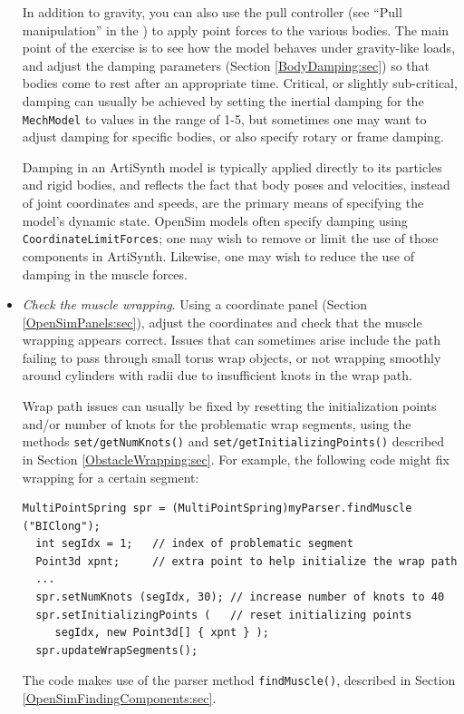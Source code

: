 \begin{itemize}
In addition to gravity, you can also use the pull controller (see ``Pull
manipulation'' in the ) to apply point forces to the various bodies. The main point of the
exercise is to see how the model behaves under gravity-like loads, and adjust
the damping parameters (Section \ref{BodyDamping:sec}) so that bodies come to
rest after an appropriate time. Critical, or slightly sub-critical, damping can
usually be achieved by setting the inertial damping for the {\tt MechModel} to
values in the range of 1-5, but sometimes one may want to adjust damping for
specific bodies, or also specify rotary or frame damping.

\begin{sideblock}
Damping in an ArtiSynth model is typically applied directly to its particles
and rigid bodies, and reflects the fact that body poses and velocities, instead
of joint coordinates and speeds, are the primary means of specifying the
model's dynamic state. OpenSim models often specify damping using {\tt
CoordinateLimitForces}; one may wish to remove or limit the use of those
components in ArtiSynth. Likewise, one may wish to reduce the use of damping in
the muscle forces.
\end{sideblock}

\item {\it Check the muscle wrapping}. Using a coordinate panel (Section
\ref{OpenSimPanels:sec}), adjust the coordinates and check that the muscle
wrapping appears correct. Issues that can sometimes arise include the path
failing to pass through small torus wrap objects, or not wrapping smoothly
around cylinders with radii due to insufficient knots in the wrap path.

Wrap path issues can usually be fixed by resetting the initialization points
and/or number of knots for the problematic wrap segments, using the methods
{\tt set/getNumKnots()} and {\tt set/getInitializingPoints()} described in
Section \ref{ObstacleWrapping:sec}. For example, the following
code might fix wrapping for a certain segment:
%
\begin{lstlisting}[]
  MultiPointSpring spr = (MultiPointSpring)myParser.findMuscle ("BIClong");
  int segIdx = 1;   // index of problematic segment
  Point3d xpnt;     // extra point to help initialize the wrap path
  ...
  spr.setNumKnots (segIdx, 30); // increase number of knots to 40
  spr.setInitializingPoints (   // reset initializing points
     segIdx, new Point3d[] { xpnt } ); 
  spr.updateWrapSegments();
\end{lstlisting}
%
The code makes use of the parser method {\tt findMuscle()},
described in Section \ref{OpenSimFindingComponents:sec}.


\end{itemize}
